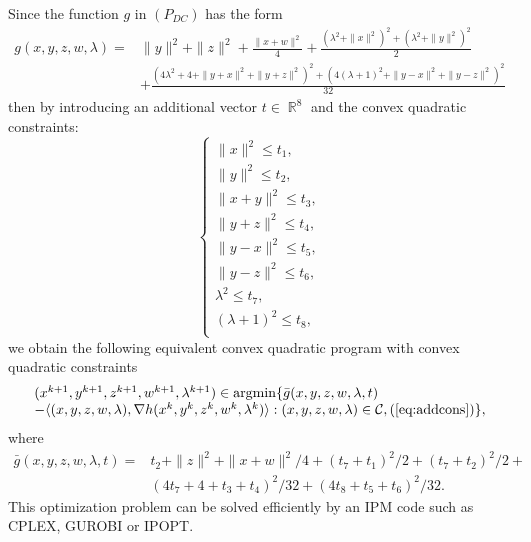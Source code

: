 \documentclass[3p]{elsarticle}
\DeclareMathOperator{\R}{\mathbb{R}}
\DeclareMathOperator{\argmin}{argmin}
\begin{document}
Since the function $g$ in $(P_{DC})$ has the form 
\[\begin{array}{rl}
g(x,y,z,w,\lambda) = &\|y\|^2 + \|z\|^2 + \frac{\|x+w\|^2}{4} + \frac{(\lambda^2 + \|x\|^2)^2 + (\lambda^2 + \|y\|^2)^2}{2} \\
& + \frac{(4\lambda^2+4 + \|y+x\|^2 + \|y+z\|^2)^2 + (4(\lambda+1)^2 + \|y-x\|^2 + \|y-z\|^2)^2}{32}
\end{array}\]
then by introducing an additional vector $t\in \R^8$ and the convex quadratic constraints:
\begin{equation}\label{eq:addcons}
\left\lbrace 
\begin{array}{l}
\|x\|^2\leq t_1,\\
\|y\|^2\leq t_2,\\
\|x+y\|^2\leq t_3,\\
\|y+z\|^2\leq t_4,\\
\|y-x\|^2\leq t_5,\\
\|y-z\|^2\leq t_6,\\
\lambda^2\leq t_7,\\
(\lambda+1)^2\leq t_8,\\
\end{array}
\right.
\end{equation} 
we obtain the following equivalent convex quadratic program with convex quadratic constraints
\begin{equation}
\begin{array}{l}
(x^{k+1},y^{k+1},z^{k+1},w^{k+1},\lambda^{k+1}) \in \argmin\{\bar{g}(x,y,z,w,\lambda,t) \\
-\langle (x,y,z,w,\lambda),\nabla h(x^k,y^k,z^k,w^k,\lambda^k)\rangle: (x,y,z,w,\lambda)\in \mathcal{C}, (\ref{eq:addcons}) \},
\end{array}
\end{equation}
where 
\begin{equation}\label{eq:gbar}
\begin{array}{rl}
\bar{g}(x,y,z,w,\lambda,t) = & t_2 + \|z\|^2 + \|x+w\|^2/4 + (t_7+t_1)^2/2 + (t_7+t_2)^2/2 +\\
&(4t_7 + 4 + t_3 + t_4)^2/32 + (4t_8 + t_5 + t_6)^2/32.
\end{array}
\end{equation}
This optimization problem can be solved efficiently by an IPM code such as CPLEX, GUROBI or IPOPT.
\end{document}
